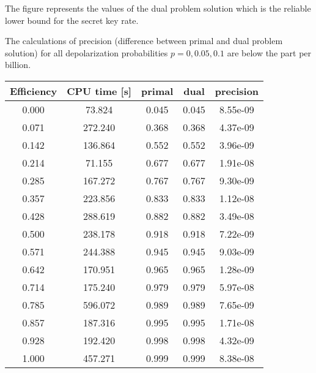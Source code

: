 \documentclass{article}
\begin{document}
 The figure represents the values of the dual problem solution which is the reliable lower bound for the secret key rate.

The calculations of precision (difference between primal and dual problem solution) for all depolarization probabilities \(p=0,0.05,0.1\) are below the part per billion.
 \\
 \begin{minipage}{0.5\linewidth}
    \centering
    \begin{tabular}{c|c|c|c|c}
        Efficiency & CPU time [s]& primal& dual& precision\\
        \hline
        0.000 & 73.824  & 0.045 & 0.045 & 8.55e-09 \\
        0.071 & 272.240 & 0.368 & 0.368 & 4.37e-09 \\
        0.142 & 136.864 & 0.552 & 0.552 & 3.96e-09 \\
        0.214 & 71.155  & 0.677 & 0.677 & 1.91e-08 \\
        0.285 & 167.272 & 0.767 & 0.767 & 9.30e-09 \\
        0.357 & 223.856 & 0.833 & 0.833 & 1.12e-08 \\
        0.428 & 288.619 & 0.882 & 0.882 & 3.49e-08 \\
        0.500 & 238.178 & 0.918 & 0.918 & 7.22e-09 \\
        0.571 & 244.388 & 0.945 & 0.945 & 9.03e-09 \\
        0.642 & 170.951 & 0.965 & 0.965 & 1.28e-09 \\
        0.714 & 175.240 & 0.979 & 0.979 & 5.97e-08 \\
        0.785 & 596.072 & 0.989 & 0.989 & 7.65e-09 \\
        0.857 & 187.316 & 0.995 & 0.995 & 1.71e-08 \\
        0.928 & 192.420 & 0.998 & 0.998 & 4.32e-09 \\
        1.000 & 457.271 & 0.999 & 0.999 & 8.38e-08 \\
        \hline
    \end{tabular}
    \label{tbl:p-0}
\end{minipage}
\end{document}
